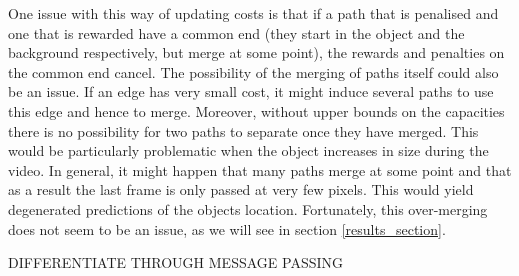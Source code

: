 \documentclass{article}
\begin{document}
One issue with this way of updating costs is that if a path that is penalised and one that is rewarded have a common end (they start in the object and the background respectively, but merge at some point), the rewards and penalties on the common end cancel. The possibility of the merging of paths itself could also be an issue. If an edge has very small cost, it might induce several paths to use this edge and hence to merge. Moreover, without upper bounds on the capacities there is no possibility for two paths to separate once they have merged. This would be particularly problematic when the object increases in size during the video. In general, it might happen that many paths merge at some point and that as a result the last frame is only passed at very few pixels. This would yield degenerated predictions of the objects location. Fortunately, this over-merging does not seem to be an issue, as we will see in section \ref{results_section}.

DIFFERENTIATE THROUGH MESSAGE PASSING
\end{document}
